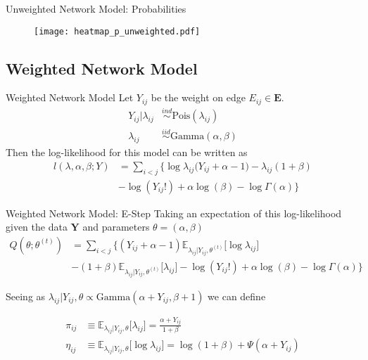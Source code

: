 \documentclass{beamer}
\begin{document}
\begin{frame}{Unweighted Network Model: Probabilities}
\begin{figure}
    \centering
    \texttt{[image: heatmap\_p\_unweighted.pdf]}
    \end{figure}
\end{frame}

\subsection{Weighted Network Model}

\begin{frame}{Weighted Network Model}
Let $Y_{ij}$ be the weight on edge $E_{ij}\in \mathbf{E}$.     
    \begin{align*}
    Y_{ij} | \lambda_{ij} &\overset{ind}\sim \text{Pois}(\lambda_{ij}) \\
    \lambda_{ij} &\overset{iid}\sim \text{Gamma}(\alpha, \beta)
\end{align*}\pause 
Then the log-likelihood for this model can be written as 
\begin{align*}
l(\lambda, \alpha, \beta ; Y) &= \sum_{i<j}\Big\{ \log \lambda_{ij}\big(Y_{ij} + \alpha - 1) - \lambda_{ij}(1+ \beta)\\
 &-\log(Y_{ij}!) + \alpha \log(\beta) - \log \Gamma(\alpha)\Big\}
\end{align*}
\end{frame}

\begin{frame}{Weighted Network Model: E-Step}
Taking an expectation of this log-likelihood given the data $\mathbf{Y}$ and parameters $\theta = (\alpha, \beta)$ 
\begin{align*}
Q(\theta; \theta^{(t)})  &= \sum_{i<j}\Big\{ (Y_{ij}+ \alpha - 1)\mathbb{E}_{\lambda_{ij}|Y_{ij}, \theta^{(t)}} \big[\log \lambda_{ij}\big] \\
    &- (1+ \beta)\mathbb{E}_{\lambda_{ij}|Y_{ij}, \theta^{(t)}}\big[\lambda_{ij}\big] -\log(Y_{ij}!) + \alpha \log(\beta) - \log \Gamma(\alpha)\Big\}
\end{align*}\pause

Seeing as $\lambda_{ij}|Y_{ij}, \theta \propto \text{Gamma}(\alpha + Y_{ij}, \beta + 1)$  we can define 

\begin{align*}
\pi_{ij} &\equiv \mathbb{E}_{\lambda_{ij}|Y_{ij}, \theta}\big[\lambda_{ij} \big] = \frac{\alpha + Y_{ij}}{1+ \beta} \\
\eta_{ij} &\equiv \mathbb{E}_{\lambda_{ij}|Y_{ij}, \theta}\big[\log \lambda_{ij} \big] = \log(1 + \beta) + \Psi (\alpha + Y_{ij})
\end{align*}

\end{frame}
\end{document}
